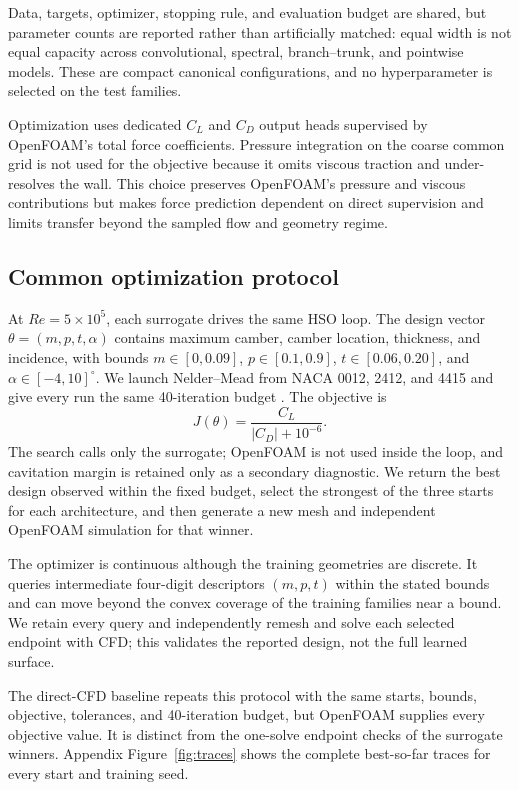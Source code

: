 \documentclass{article}
\begin{document}
Data, targets, optimizer, stopping rule, and evaluation budget are shared, but
parameter counts are reported rather than artificially matched: equal width is
not equal capacity across convolutional, spectral, branch--trunk, and pointwise
models. These are compact canonical configurations, and no hyperparameter is
selected on the test families.

Optimization uses dedicated $C_L$ and $C_D$ output heads supervised by
OpenFOAM's total force coefficients. Pressure integration on the coarse common
grid is not used for the objective because it omits viscous traction and
under-resolves the wall. This choice preserves OpenFOAM's pressure and viscous
contributions but makes force prediction dependent on direct supervision and
limits transfer beyond the sampled flow and geometry regime.

\subsection{Common optimization protocol}
At $Re=5\times10^5$, each surrogate drives the same HSO loop. The design
vector $\theta=(m,p,t,\alpha)$ contains maximum camber, camber location,
thickness, and incidence, with bounds $m\in[0,0.09]$, $p\in[0.1,0.9]$,
$t\in[0.06,0.20]$, and $\alpha\in[-4,10]^{\circ}$. We launch Nelder--Mead
from NACA 0012, 2412, and 4415 and give every run the same 40-iteration budget
\citep{nelder1965simplex}. The objective is
\begin{equation}
J(\theta)=\frac{C_L}{|C_D|+10^{-6}}.
\end{equation}
The search calls only the surrogate; OpenFOAM is not used inside the loop, and
cavitation margin is retained only as a secondary diagnostic. We return the
best design observed within the
fixed budget, select the strongest of the three starts for each architecture,
and then generate a new mesh and independent OpenFOAM simulation for that
winner.

The optimizer is continuous although the training geometries are discrete. It
queries intermediate four-digit descriptors $(m,p,t)$ within the stated bounds
and can move beyond the convex coverage of the training families near a bound.
We retain every query and independently remesh and solve each selected endpoint
with CFD; this validates the reported design, not the full learned surface.

The direct-CFD baseline repeats this protocol with the same starts, bounds,
objective, tolerances, and 40-iteration budget, but OpenFOAM supplies every
objective value. It is distinct from the one-solve endpoint checks of the
surrogate winners. Appendix Figure~\ref{fig:traces} shows the complete
best-so-far traces for every start and training seed.
\end{document}
